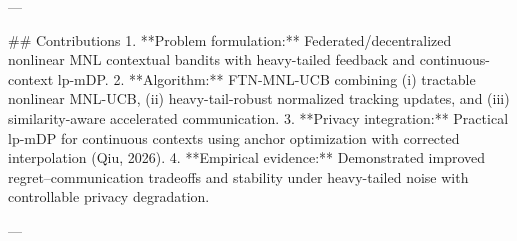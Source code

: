 ---

## Contributions  
1. **Problem formulation:** Federated/decentralized nonlinear MNL contextual bandits with heavy-tailed feedback and continuous-context lp-mDP.  
2. **Algorithm:** FTN-MNL-UCB combining (i) tractable nonlinear MNL-UCB, (ii) heavy-tail-robust normalized tracking updates, and (iii) similarity-aware accelerated communication.  
3. **Privacy integration:** Practical lp-mDP for continuous contexts using anchor optimization with corrected interpolation (Qiu, 2026).  
4. **Empirical evidence:** Demonstrated improved regret–communication tradeoffs and stability under heavy-tailed noise with controllable privacy degradation.

---